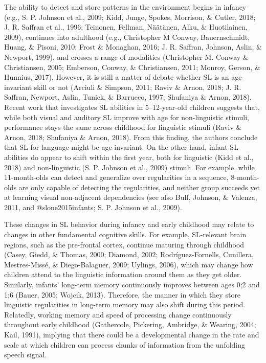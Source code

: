 \documentclass[man,mask,floatsintext]{apa6}
\begin{document}
The ability to detect and store patterns in the environment begins in
infancy (e.g., S. P. Johnson et al., 2009; Kidd, Junge, Spokes,
Morrison, \& Cutler, 2018; J. R. Saffran et al., 1996; Teinonen,
Fellman, Näätänen, Alku, \& Huotilainen, 2009), continues into adulthood
(e.g., Christopher M Conway, Bauernschmidt, Huang, \& Pisoni, 2010;
Frost \& Monaghan, 2016; J. R. Saffran, Johnson, Aslin, \& Newport,
1999), and crosses a range of modalities (Christopher M. Conway \&
Christiansen, 2005; Emberson, Conway, \& Christiansen, 2011; Monroy,
Gerson, \& Hunnius, 2017). However, it is still a matter of debate
whether SL is an age-invariant skill or not (Arciuli \& Simpson, 2011;
Raviv \& Arnon, 2018; J. R. Saffran, Newport, Aslin, Tunick, \&
Barrueco, 1997; Shufaniya \& Arnon, 2018). Recent work that investigates
SL abilities in 5--12-year-old children suggests that, while both visual
and auditory SL improve with age for non-linguistic stimuli, performance
stays the same across childhood for linguistic stimuli (Raviv \& Arnon,
2018; Shufaniya \& Arnon, 2018). From this finding, the authors conclude
that SL for language might be age-invariant. On the other hand, infant
SL abilities do appear to shift within the first year, both for
linguistic (Kidd et al., 2018) and non-linguistic (S. P. Johnson et al.,
2009) stimuli. For example, while 11-month-olds can detect and
generalize over regularities in a sequence, 8-month-olds are only
capable of detecting the regularities, and neither group succeeds yet at
learning visual non-adjacent dependencies (see also Bulf, Johnson, \&
Valenza, 2011, and @slone2015infants; S. P. Johnson et al., 2009).

These changes in SL behavior during infancy and early childhood may
relate to changes in other fundamental cognitive skills. For example,
SL-relevant brain regions, such as the pre-frontal cortex, continue
maturing through childhood (Casey, Giedd, \& Thomas, 2000; Diamond,
2002; Rodríguez-Fornells, Cunillera, Mestres-Missé, \& Diego-Balaguer,
2009; Uylings, 2006), which may change how children attend to the
linguistic information around them as they get older. Similarly,
infants' long-term memory continuously improves between ages 0;2 and 1;6
(Bauer, 2005; Wojcik, 2013). Therefore, the manner in which they store
linguistic regularities in long-term memory may also shift during this
period. Relatedly, working memory and speed of processing change
continuously throughout early childhood (Gathercole, Pickering,
Ambridge, \& Wearing, 2004; Kail, 1991), implying that there could be a
developmental change in the rate and scale at which children can process
chunks of information from the unfolding speech signal.
\end{document}
